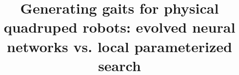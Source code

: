 \documentclass{sig-alternate}
\begin{document}
%

\title{Generating gaits for physical quadruped robots: evolved neural networks vs. local parameterized search}
%
%
%
%
%

%
\end{document}

